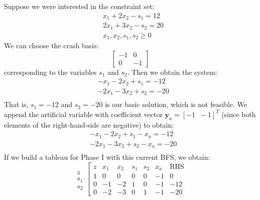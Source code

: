 \begin{example}
Suppose we were interested in the constraint set:
\begin{equation}
\begin{aligned}
&	x_1 + 2x_2 - s_1  = 12\\
&	2x_1 + 3x_2 - s_2 = 20\\
&	x_1, x_2, s_1, s_2 \geq 0
\end{aligned}
\end{equation}
We can choose the crash basis:
\begin{equation}
\begin{bmatrix}
-1 & 0\\
0 & -1
\end{bmatrix}
\end{equation}
corresponding to the variables $s_1$ and $s_2$. Then we obtain the system:
\begin{equation}
\begin{aligned}
&	-x_1  - 2x_2 + s_1  = -12\\
&	-2x_1 - 3x_2 + s_2 = -20\\
\end{aligned}
\end{equation}
That is, $s_1 = -12$ and $s_2 = -20$ is our basic solution, which is not feasible. We append the artificial variable with coefficient vector $\mathbf{y}_a = [-1\;\;-1]^T$ (since both elements of the right-hand-side are negative) to obtain:
\begin{equation}
\begin{aligned}
&	-x_1  - 2x_2 + s_1 -x_a = -12\\
&	-2x_1 - 3x_2 + s_2 -x_a = -20\\
\end{aligned}
\end{equation}
If we build a tableau for Phase I with this current BFS, we obtain:
\begin{displaymath}
\begin{array}{c}
\\
z\\
s_{1}\\
s_{2}
\end{array}
\left[
\begin{array}{c|ccccc|c}
z & x_1 & x_2 & s_1 & s_2 & x_{a} & \text{RHS}\\
\hline
1 & 0 & 0 & 0 & 0 & -1& 0\\
\hline
0 & -1 & -2 & 1 & 0  & -1 &  -12\\
0 & -2 & -3 & 0 & 1  & -1 & -20
\end{array}

\end{displaymath}
\end{example}

